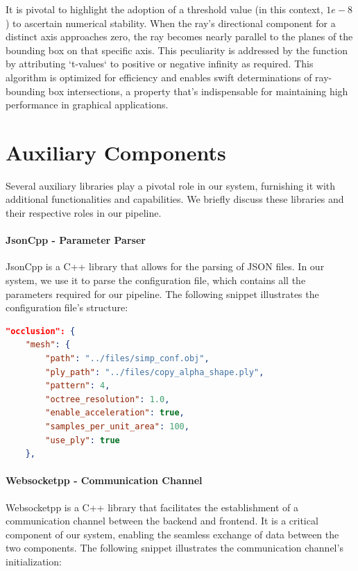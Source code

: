 \documentclass[11pt, a4paper,oneside,chapterprefix=false]{scrbook}
\begin{document}
It is pivotal to highlight the adoption of a threshold value (in this context, \(1e-8\)) to ascertain numerical stability. When the ray's directional component for a distinct axis approaches zero, the ray becomes nearly parallel to the planes of the bounding box on that specific axis. This peculiarity is addressed by the function by attributing `t-values` to positive or negative infinity as required. This algorithm is optimized for efficiency and enables swift determinations of ray-bounding box intersections, a property that's indispensable for maintaining high performance in graphical applications.

\section{Auxiliary Components} \label{subsec:supporting libraries}

Several auxiliary libraries play a pivotal role in our system, furnishing it with additional functionalities and capabilities. We briefly discuss these libraries and their respective roles in our pipeline.

\paragraph{JsonCpp - Parameter Parser} \label{par:jsoncpp}

JsonCpp is a C++ library that allows for the parsing of JSON files. In our system, we use it to parse the configuration file, which contains all the parameters required for our pipeline. The following snippet illustrates the configuration file's structure:

\begin{lstlisting}[language=json, caption=Json Configuration File]
"occlusion": {
    "mesh": {
        "path": "../files/simp_conf.obj",
        "ply_path": "../files/copy_alpha_shape.ply",
        "pattern": 4,
        "octree_resolution": 1.0,
        "enable_acceleration": true,
        "samples_per_unit_area": 100,
        "use_ply": true
    },
\end{lstlisting}

\paragraph{Websocketpp - Communication Channel} \label{par:websocketpp}

Websocketpp is a C++ library that facilitates the establishment of a communication channel between the backend and frontend. It is a critical component of our system, enabling the seamless exchange of data between the two components. The following snippet illustrates the communication channel's initialization:
\end{document}
